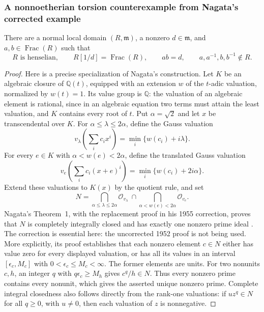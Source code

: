 \subsubsection{A nonnoetherian torsion counterexample from Nagata's corrected example}

\begin{lemma}\label{C:Nagata-input}
There are a normal local domain $(R,\mathfrak m)$, a nonzero
$d\in\mathfrak m$, and $a,b\in\operatorname{Frac}(R)$ such that
\[
 R\text{ is henselian},\qquad R[1/d]=\operatorname{Frac}(R),
 \qquad ab=d,
 \qquad a,a^{-1},b,b^{-1}\notin R.
\]
\end{lemma}
\begin{proof}
Here is a precise specialization of Nagata's construction. Let $K$ be
an algebraic closure of $\mathbb Q(t)$, equipped with an extension $w$
of the $t$-adic valuation, normalized by $w(t)=1$. Its value group is
$\mathbb Q$: the valuation of an algebraic element is rational, since
in an algebraic equation two terms must attain the least valuation,
and $K$ contains every root of $t$. Put $\alpha=\sqrt2$ and let $x$
be transcendental over $K$. For $\alpha\leq\lambda\leq2\alpha$,
define the Gauss valuation
\[
 v_\lambda\left(\sum_i c_i x^i\right)
   =\min_i\{w(c_i)+i\lambda\}.
\]
For every $e\in K$ with $\alpha<w(e)<2\alpha$, define the translated
Gauss valuation
\[
 v_e\left(\sum_i c_i(x+e)^i\right)
   =\min_i\{w(c_i)+2i\alpha\}.
\]
Extend these valuations to $K(x)$ by the quotient rule, and set
\[
 N=\bigcap_{\alpha\leq\lambda\leq2\alpha}\mathcal O_{v_\lambda}
   \ \cap\!
   \bigcap_{\alpha<w(e)<2\alpha}\mathcal O_{v_e}.
\]
Nagata's Theorem~1, with the replacement proof in his 1955
correction, proves that $N$ is completely integrally closed and
has exactly one nonzero prime ideal
\cite[Theorem~1, pp.~29--31]{CNagata1952}
\cite[pp.~209--212, replacing p.~30 line~14 through p.~31 line~7]{CNagata1955}.
The correction is essential here: the uncorrected 1952 proof is not
being used. More explicitly, its proof establishes that each nonzero
element $c\in N$ either has value zero for every displayed valuation,
or has all its values in an interval $[\epsilon_c,M_c]$ with
$0<\epsilon_c\leq M_c<\infty$. The former elements are units. For
two nonunits $c,h$, an integer $q$ with $q\epsilon_c\geq M_h$
gives $c^q/h\in N$. Thus every nonzero prime contains every nonunit,
which gives the asserted unique nonzero prime. Complete integral
closedness also follows directly from the rank-one valuations:
if $u z^q\in N$ for all $q\geq0$, with $u\ne0$, then each valuation
of $z$ is nonnegative.


\end{proof}
